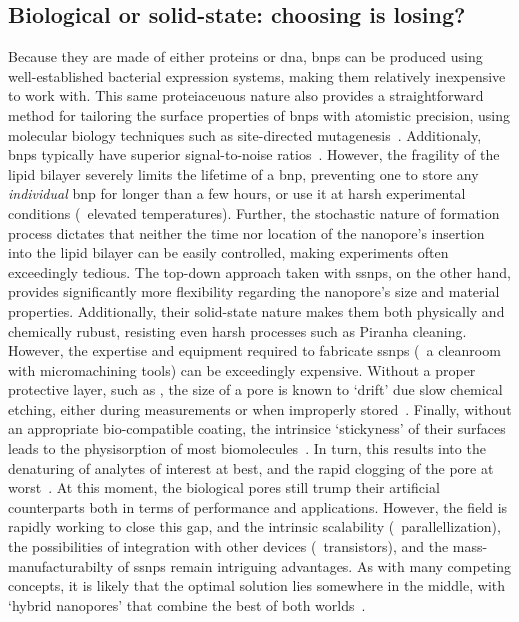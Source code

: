 \subsection{Biological or solid-state: choosing is losing?}
%

Because they are made of either proteins or \gls{dna}, \glspl{bnp} can be produced using well-established
bacterial expression systems, making them relatively inexpensive to work with. This same proteiaceuous nature
also provides a straightforward method for tailoring the surface properties of \glspl{bnp} with atomistic
precision, using molecular biology techniques such as site-directed
mutagenesis~\cite{Howorka-2001,RinconRestrepo-2011}. Additionaly, \glspl{bnp} typically have superior
signal-to-noise ratios~\cite{Fragasso-2020}. However, the fragility of the lipid bilayer severely limits the
lifetime of a \gls{bnp}, preventing one to store any \emph{individual} \gls{bnp} for longer than a few hours,
or use it at harsh experimental conditions (\eg~elevated temperatures). Further, the stochastic nature of
formation process dictates that neither the time nor location of the nanopore's insertion into the lipid
bilayer can be easily controlled, making experiments often exceedingly tedious. The top-down approach taken
with \glspl{ssnp}, on the other hand, provides significantly more flexibility regarding the nanopore's size
and material properties. Additionally, their solid-state nature makes them both physically and chemically
rubust, resisting even harsh processes such as Piranha cleaning. However, the expertise and equipment required
to fabricate \glspl{ssnp} (\ie~a cleanroom with micromachining tools) can be exceedingly expensive. Without a
proper protective layer, such as , the size of a  pore is known to `drift' due slow
chemical etching, either during measurements or when improperly stored~\cite{Chou-2020}. Finally, without an
appropriate bio-compatible coating, the intrinsice `stickyness' of their surfaces leads to the physisorption
of most biomolecules~\cite{Eggenberger-2019,Awasthi-2020}. In turn, this results into the denaturing of
analytes of interest at best, and the rapid clogging of the pore at worst~\cite{Yusko-2011}. At this moment,
the biological pores still trump their artificial counterparts both in terms of performance and applications.
However, the field is rapidly working to close this gap, and the intrinsic scalability (\eg~parallellization),
the possibilities of integration with other devices (\eg~transistors), and the mass-manufacturabilty of
\glspl{ssnp} remain intriguing advantages. As with many competing concepts, it is likely that the optimal
solution lies somewhere in the middle, with `hybrid nanopores' that combine the best of both
worlds~\cite{Hall-2010,Im-2010,Cai-2018}.

